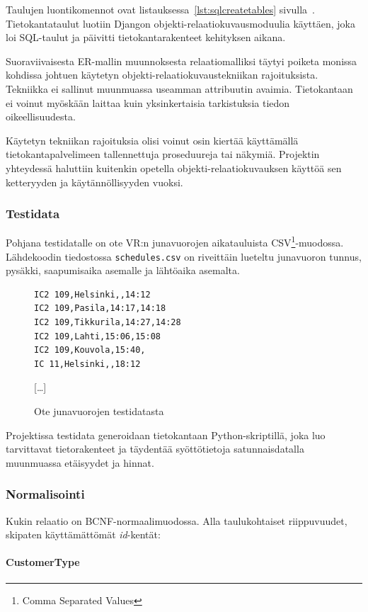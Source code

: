 \documentclass[a4paper,twoside,titlepage,12pt]{article}
\begin{document}
Taulujen luontikomennot ovat listauksessa~\ref{lst:sqlcreatetables} sivulla~\pageref{lst:sqlcreatetables}. Tietokantataulut luotiin Djangon objekti-relaatiokuvausmoduulia käyttäen, joka loi SQL-taulut ja päivitti tietokantarakenteet kehityksen aikana.

Suoraviivaisesta ER-mallin muunnoksesta relaatiomalliksi täytyi poiketa monissa kohdissa johtuen käytetyn objekti-relaatiokuvaustekniikan rajoituksista. Tekniikka ei sallinut muunmuassa useamman attribuutin avaimia. Tietokantaan ei voinut myöskään laittaa kuin yksinkertaisia tarkistuksia tiedon oikeellisuudesta.

Käytetyn tekniikan rajoituksia olisi voinut osin kiertää käyttämällä tietokantapalvelimeen tallennettuja proseduureja tai näkymiä. Projektin yhteydessä haluttiin kuitenkin opetella objekti-relaatiokuvauksen käyttöä sen ketteryyden ja käytännöllisyyden vuoksi.

\subsubsection{Testidata}

Pohjana testidatalle on ote VR:n junavuorojen aikatauluista CSV\footnote{Comma Separated Values}-muodossa. Lähdekoodin tiedostossa \texttt{schedules.csv} on riveittäin lueteltu junavuoron tunnus, pysäkki, saapumisaika asemalle ja lähtöaika asemalta.

\begin{figure}
\begin{lstlisting}
IC2 109,Helsinki,,14:12
IC2 109,Pasila,14:17,14:18
IC2 109,Tikkurila,14:27,14:28
IC2 109,Lahti,15:06,15:08
IC2 109,Kouvola,15:40,
IC 11,Helsinki,,18:12
\end{lstlisting}
[\ldots]
  \caption{Ote junavuorojen testidatasta}
\end{figure}

Projektissa testidata generoidaan tietokantaan Python-skriptillä, joka luo tarvittavat tietorakenteet ja täydentää syöttötietoja satunnaisdatalla muunmuassa etäisyydet ja hinnat.

\subsubsection{Normalisointi}

Kukin relaatio on BCNF-normaalimuodossa. Alla taulukohtaiset riippuvuudet,
skipaten käyttämättömät \emph{id}-kentät:

\paragraph{CustomerType}
\end{document}
